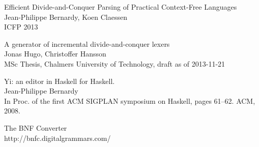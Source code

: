 \documentclass[a4paper,12pt]{article}
\begin{document}
\begin{thebibliography}{9}

    Efficient Divide-and-Conquer Parsing of Practical Context-Free Languages \\
    Jean-Philippe Bernardy, Koen Claessen \\
    ICFP 2013

    A generator of incremental divide-and-conquer lexers \\
    Jonas Hugo, Christoffer Hansson \\
    MSc Thesis, Chalmers University of Technology, draft as of 2013-11-21

    Yi: an editor in Haskell for Haskell. \\
    Jean-Philippe Bernardy \\
    In Proc. of the first ACM SIGPLAN symposium on Haskell, pages 61–62. ACM,
    2008.

    The BNF Converter \\
    http://bnfc.digitalgrammars.com/

\end{thebibliography}
\end{document}
